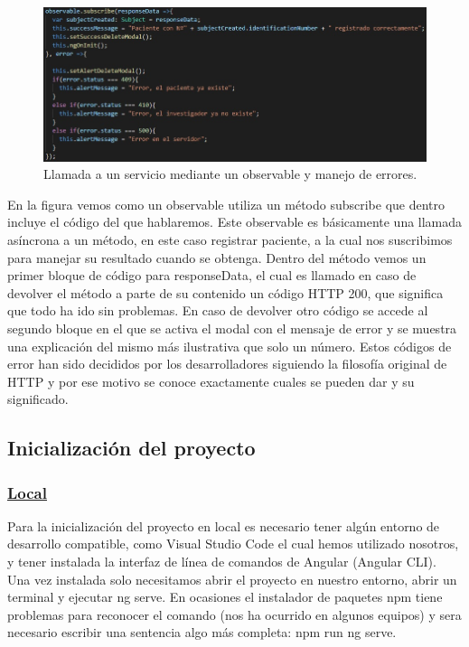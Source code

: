     \begin{figure}[h]
    \centering
    \includegraphics[width=1\textwidth]{images/observableAndErrors.jpg}
    \caption{Llamada a un servicio mediante un observable y manejo de errores.}
    \end{figure}
    \FloatBarrier
    
    En la figura vemos como un observable utiliza un método subscribe que dentro incluye el código del que hablaremos. Este observable es básicamente una llamada asíncrona a un método, en este caso registrar paciente, a la cual nos suscribimos para manejar su resultado cuando se obtenga. Dentro del método vemos un primer bloque de código para responseData, el cual es llamado en caso de devolver el método a parte de su contenido un código HTTP 200, que significa que todo ha ido sin problemas. En caso de devolver otro código se accede al segundo bloque en el que se activa el modal con el mensaje de error y se muestra una explicación del mismo más ilustrativa que solo un número. Estos códigos de error han sido decididos por los desarrolladores siguiendo la filosofía original de HTTP y por ese motivo se conoce exactamente cuales se pueden dar y su significado.\newpage
    
    \subsection{Inicialización del proyecto}
    
        \subsubsection{\underline{Local}}
        
        Para la inicialización del proyecto en local es necesario tener algún entorno de desarrollo compatible, como Visual Studio Code el cual hemos utilizado nosotros, y tener instalada la interfaz de línea de comandos de Angular (Angular CLI). Una vez instalada solo necesitamos abrir el proyecto en nuestro entorno, abrir un terminal y ejecutar ng serve. En ocasiones el instalador de paquetes npm tiene problemas para reconocer el comando (nos ha ocurrido en algunos equipos) y sera necesario escribir una sentencia algo más completa: npm run ng serve.
